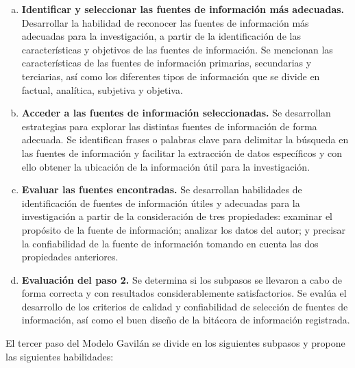 \begin{enumerate}[a.]
  \item \textbf{Identificar y seleccionar las fuentes de información más adecuadas.} Desarrollar la habilidad de reconocer las fuentes de información más adecuadas para la investigación, a partir de la identificación de las características y objetivos de las fuentes de información. Se mencionan las características de las fuentes de información primarias, secundarias y terciarias, así como los diferentes tipos de información que se divide en factual, analítica, subjetiva y objetiva.
  \item \textbf{Acceder a las fuentes de información seleccionadas.} Se desarrollan estrategias para explorar las distintas fuentes de información de forma adecuada. Se identifican frases o palabras clave para delimitar la búsqueda en las fuentes de información y facilitar la extracción de datos específicos y con ello obtener la ubicación de la información útil para la investigación.
  \item \textbf{Evaluar las fuentes encontradas.} Se desarrollan habilidades de identificación de fuentes de información útiles y adecuadas para la investigación a partir de la consideración de tres propiedades: examinar el propósito de la fuente de información; analizar los datos del autor; y precisar la confiabilidad de la fuente de información tomando en cuenta las dos propiedades anteriores.
  \item \textbf{Evaluación del paso 2.} Se determina si los subpasos se llevaron a cabo de forma correcta y con resultados considerablemente satisfactorios. Se evalúa el desarrollo de los criterios de calidad y confiabilidad de selección de fuentes de información, así como el buen diseño de la bitácora de información registrada.
\end{enumerate}

El tercer paso del Modelo Gavilán se divide en los siguientes subpasos y propone las siguientes habilidades:

